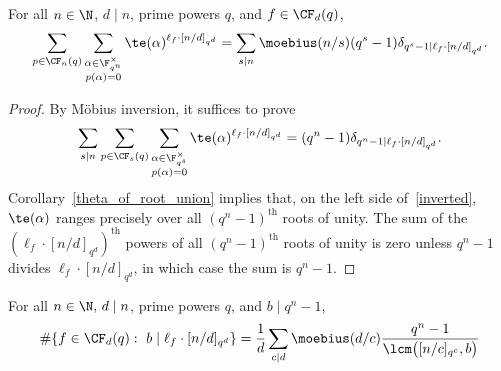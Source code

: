 \begin{lemma}
\label{pre_pre_main}
For all \(n \in \N\), \(d \mid n\), prime powers \(q\), and \(f \in \CF_d (q)\),
\begin{equation}
\sum_{p \in \CF_n (q)}
\sum_{\substack{\alpha \in \F_{q^n}^\times \\ p(\alpha) = 0}}
\te(\alpha)^{\ell_f \cdot [n/d]_{q^d}}
=
\sum_{s \mid n} \moebius(n/s) (q^s-1) \delta_{q^s - 1 \mid \ell_f \cdot [n/d]_{q^d}}.
\end{equation}
\end{lemma}


\begin{proof}
By M\"obius inversion, it suffices to prove
\begin{equation}
\label{inverted}
\sum_{s \mid n}
\sum_{p \in \CF_s (q)}
\sum_{\substack{\alpha \in \F_{q^s}^\times \\ p(\alpha) = 0}}
\te (\alpha)^{\ell_f \cdot [n/d]_{q^d}}
=
(q^n - 1) \delta_{q^n - 1 \mid \ell_f \cdot [n/d]_{q^d}}.
\end{equation}
Corollary~\ref{theta_of_root_union} implies that, on the left side of~\eqref{inverted}, \(\te(\alpha)\) ranges precisely over all \((q^n-1)^\text{th}\) roots of unity.
The sum of the \((\ell_f \cdot [n/d]_{q^d})^\text{th}\) powers of all \((q^n-1)^\text{th}\) roots of unity is zero unless \(q^n-1\) divides \(\ell_f \cdot [n/d]_{q^d}\), in which case the sum is \(q^n-1\).
\end{proof}


\begin{lemma}
\label{post_pre_pre_main}
For all \(n \in \N, \, d \mid n\), prime powers \(q\), and \(b \mid q^n-1\),
\begin{equation}
\# \{f \in \CF_d (q) : \, \, b \mid \ell_f \cdot [n/d]_{q^d}\}
=
\frac{1}{d}
\sum_{c \mid d}
\moebius(d/c)
\frac{q^n-1}{\lcm \big (
[n/c]_{q^c}, b
\big )}
\end{equation}
\end{lemma}


